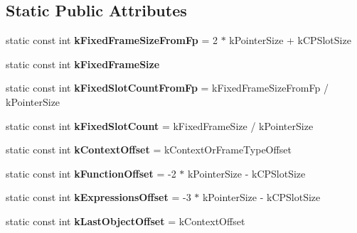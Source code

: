 \subsection*{Static Public Attributes}
\begin{DoxyCompactItemize}
\item 
static const int {\bfseries k\+Fixed\+Frame\+Size\+From\+Fp} = 2 $\ast$ k\+Pointer\+Size + k\+C\+P\+Slot\+Size\hypertarget{classv8_1_1internal_1_1_standard_frame_constants_a0db002458129602ffa3d7ca1f7ed7b48}{}\label{classv8_1_1internal_1_1_standard_frame_constants_a0db002458129602ffa3d7ca1f7ed7b48}

\item 
static const int {\bfseries k\+Fixed\+Frame\+Size}
\item 
static const int {\bfseries k\+Fixed\+Slot\+Count\+From\+Fp} = k\+Fixed\+Frame\+Size\+From\+Fp / k\+Pointer\+Size\hypertarget{classv8_1_1internal_1_1_standard_frame_constants_ac93ac36535e891f37b56221a085f6d58}{}\label{classv8_1_1internal_1_1_standard_frame_constants_ac93ac36535e891f37b56221a085f6d58}

\item 
static const int {\bfseries k\+Fixed\+Slot\+Count} = k\+Fixed\+Frame\+Size / k\+Pointer\+Size\hypertarget{classv8_1_1internal_1_1_standard_frame_constants_ad73ff26301417d058b758b13471e470f}{}\label{classv8_1_1internal_1_1_standard_frame_constants_ad73ff26301417d058b758b13471e470f}

\item 
static const int {\bfseries k\+Context\+Offset} = k\+Context\+Or\+Frame\+Type\+Offset\hypertarget{classv8_1_1internal_1_1_standard_frame_constants_a485e03f4ddb7fa049c0aaffb8c7115cf}{}\label{classv8_1_1internal_1_1_standard_frame_constants_a485e03f4ddb7fa049c0aaffb8c7115cf}

\item 
static const int {\bfseries k\+Function\+Offset} = -\/2 $\ast$ k\+Pointer\+Size -\/ k\+C\+P\+Slot\+Size\hypertarget{classv8_1_1internal_1_1_standard_frame_constants_a8f6e3fa65a94b6e7872cca34eef48304}{}\label{classv8_1_1internal_1_1_standard_frame_constants_a8f6e3fa65a94b6e7872cca34eef48304}

\item 
static const int {\bfseries k\+Expressions\+Offset} = -\/3 $\ast$ k\+Pointer\+Size -\/ k\+C\+P\+Slot\+Size\hypertarget{classv8_1_1internal_1_1_standard_frame_constants_a824ec6353b1bd4638452f51705bbf1fd}{}\label{classv8_1_1internal_1_1_standard_frame_constants_a824ec6353b1bd4638452f51705bbf1fd}

\item 
static const int {\bfseries k\+Last\+Object\+Offset} = k\+Context\+Offset\hypertarget{classv8_1_1internal_1_1_standard_frame_constants_ac5a79a37db7fd1835d9c2b9f47b7f744}{}\label{classv8_1_1internal_1_1_standard_frame_constants_ac5a79a37db7fd1835d9c2b9f47b7f744}

\end{DoxyCompactItemize}


